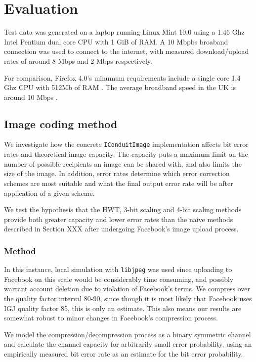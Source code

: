 \chapter{Evaluation}\label{ch:evaluation}

Test data was generated on a laptop running Linux Mint 10.0 using a 1.46 Ghz Intel Pentium dual core CPU with 1 GiB of RAM. A 10 Mbpbs broaband connection was used to connect to the internet, with measured download/upload rates of around 8 Mbps and 2 Mbps respectively.

For comparison, Firefox 4.0's minumum requirements include a single core 1.4 Ghz CPU with 512Mb of RAM \cite{firefox-req}. The average broadband speed in the UK is around 10 Mbps \cite{bband-stats}. 

\section{Image coding method}

We investigate how the concrete {\tt IConduitImage} implementation affects bit error rates and theoretical image capacity. The capacity puts a maximum limit on the number of possible recipients an image can be shared with, and also limits the size of the image. In addition, error rates determine which error correction schemes are most suitable and what the final output error rate will be after application of a given scheme.

We test the hypothesis that the HWT, 3-bit scaling and 4-bit scaling methods provide both greater capacity and lower error rates than the naive methods described in Section XXX after undergoing Facebook's image upload process.

\subsection{Method}

In this instance, local simulation with {\tt libjpeg} was used since uploading to Facebook on this scale would be considerably time consuming, and possibly warrant account deletion due to violation of Facebook's terms. We compress over the quality factor interval 80-90, since though it is most likely that Facebook uses IGJ quality factor 85, this is only an estimate. This also means our results are somewhat robust to minor changes in Facebook's compression process.

We model the compression/decompression process as a binary symmetric channel and calculate the channel capacity for arbitrarily small error probability, using an empirically measured bit error rate as an estimate for the bit error probability.

